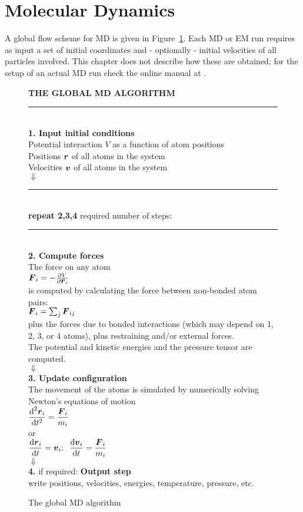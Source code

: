 \section{Molecular Dynamics}
\label{sec:MD}
A global flow scheme for MD is given in Figure~\ref{fig:global}. Each
MD or  EM run requires as input a set of initial coordinates and -
optionally - initial velocities of all particles involved. This
chapter does not describe how these are obtained; for the setup of an
actual MD run check the online manual at {\wwwpage}.
\begin{figure}
\begin{center}
\addtolength{\fboxsep}{0.5cm}
\begin{shadowenv}[12cm]
{\large \bf THE GLOBAL MD ALGORITHM}
\rule{\textwidth}{2pt} \\
{\bf 1. Input initial conditions}\\[2ex]
Potential interaction $V$ as a function of atom positions\\
Positions $\mbox{\boldmath ${r}$}$ of all atoms in the system\\
Velocities $\mbox{\boldmath ${v}$}$ of all atoms in the system \\
$\Downarrow$\\
\rule{\textwidth}{1pt}\\
{\bf repeat 2,3,4} required number of steps:\\
\rule{\textwidth}{1pt}\\
{\bf 2. Compute forces} \\[1ex]
The force on any atom  \\[1ex]
$\mbox{\boldmath ${F}$}_i = - \frac{\partial V}{\partial \mbox{\boldmath ${r}$}_i}$ \\[1ex]
is computed by calculating the force between non-bonded atom pairs: \\
$\mbox{\boldmath ${F}$}_i = \sum_j \mbox{\boldmath ${F}$}_{ij}$ \\
plus the forces due to bonded interactions (which may depend on 1, 2,
3, or 4 atoms), plus restraining and/or external forces. \\
The potential and kinetic energies and the pressure tensor are computed. \\   
$\Downarrow$\\
{\bf 3. Update configuration} \\[1ex]
The movement of the atoms is simulated by numerically solving Newton's
equations of motion \\[1ex]
$\displaystyle
\frac {\mbox{d}^2\mbox{\boldmath ${r}$}_i}{\mbox{d} t^2} = \frac{\mbox{\boldmath ${F}$}_i}{m_i} $ \\
or \\
$\displaystyle
\frac{\mbox{d}\mbox{\boldmath ${r}$}_i}{\mbox{d} t} = \mbox{\boldmath ${v}$}_i ; \;\;
\frac{\mbox{d}\mbox{\boldmath ${v}$}_i}{\mbox{d} t} = \frac{\mbox{\boldmath ${F}$}_i}{m_i} $ \\[1ex]
$\Downarrow$ \\
{\bf 4.} if required: {\bf Output step} \\
write positions, velocities, energies, temperature, pressure, etc. \\
\end{shadowenv}
\caption{The global MD algorithm}
\label{fig:global}
\end{center}
\end{figure}

